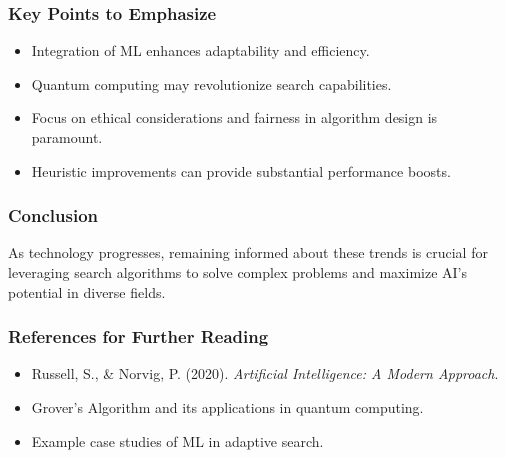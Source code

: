 \documentclass[aspectratio=169]{beamer}
\begin{document}
\begin{frame}[fragile]
    \frametitle{Key Points to Emphasize}
    \begin{itemize}
        \item Integration of ML enhances adaptability and efficiency.
        \item Quantum computing may revolutionize search capabilities.
        \item Focus on ethical considerations and fairness in algorithm design is paramount.
        \item Heuristic improvements can provide substantial performance boosts.
    \end{itemize}
\end{frame}

\begin{frame}[fragile]
    \frametitle{Conclusion}
    As technology progresses, remaining informed about these trends is crucial for leveraging search algorithms to solve complex problems and maximize AI's potential in diverse fields.
\end{frame}

\begin{frame}[fragile]
    \frametitle{References for Further Reading}
    \begin{itemize}
        \item Russell, S., \& Norvig, P. (2020). \textit{Artificial Intelligence: A Modern Approach}.
        \item Grover's Algorithm and its applications in quantum computing.
        \item Example case studies of ML in adaptive search.
    \end{itemize}
\end{frame}
\end{document}
